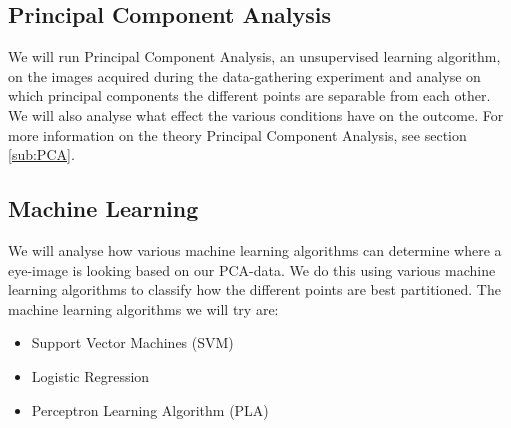 \subsection{Principal Component Analysis}
We will run Principal Component Analysis, an unsupervised learning algorithm, on the images acquired during the data-gathering experiment and analyse on which principal components the different points are separable from each other.
We will also analyse what effect the various conditions have on the outcome. %
For more information on the theory Principal Component Analysis, see section \ref{sub:PCA}.

\subsection{Machine Learning}
We will analyse how various machine learning algorithms can determine where a eye-image is looking based on our PCA-data.
We do this using various machine learning algorithms to classify how the different points are best partitioned.
The machine learning algorithms we will try are:
\begin{itemize}
	\item{Support Vector Machines (SVM)}
	\item{Logistic Regression}
	\item{Perceptron Learning Algorithm (PLA)}
\end{itemize}





